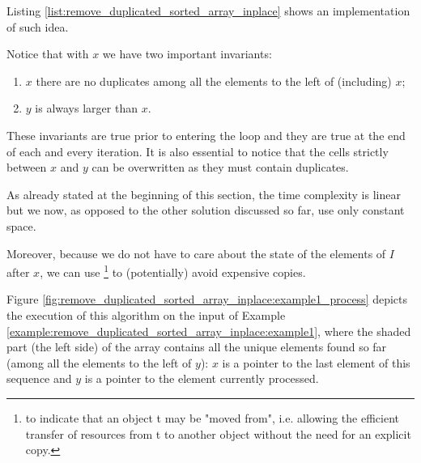 Listing \ref{list:remove_duplicated_sorted_array_inplace} shows an implementation of such idea.




Notice that with $x$ we have two important invariants:
\begin{enumerate}
	\item $x$ there are no duplicates among all the elements to the left of (including) $x$;
	\item $y$ is always larger than $x$.
\end{enumerate}

These invariants are true prior to entering the  loop and they are true at the end of each and every iteration. It is also essential to notice that the cells strictly between $x$ and $y$ can be overwritten as they must contain duplicates.


As already stated at the beginning of this section, the time complexity is linear but we now, as opposed to the other solution discussed so far, use only constant space. 

Moreover, because we do not have to care about the state of the elements of $I$ after $x$,
we can use \href{https://en.cppreference.com/w/cpp/utility/move}{}\footnote{ to indicate that an object t may be "moved from", i.e. allowing the efficient transfer of resources from t to another object without the need for an explicit copy.} to (potentially) avoid expensive copies.

Figure \ref{fig:remove_duplicated_sorted_array_inplace:example1_process} depicts the execution of this algorithm on the input of Example \ref{example:remove_duplicated_sorted_array_inplace:example1}, where the shaded part (the left side) of the array contains all the unique elements found so far (among all the elements to the left of $y$): $x$ is a pointer to the last element of this sequence and $y$ is a pointer to the element currently processed.


